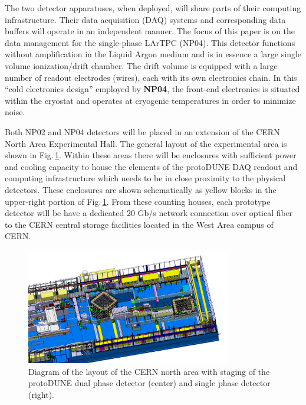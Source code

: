\documentclass[a4paper]{jpconf}
\newcommand{\pd}{protoDUNE\xspace}
\begin{document}
The two detector apparatuses, when deployed, will share parts of their
computing infrastructure.  Their data acquisition (DAQ) systems and
corresponding data buffers will operate in an independent manner. 
The focus of this paper is on the data management for the
single-phase LArTPC (NP04).
This detector  functions without amplification
in the Liquid Argon medium and is in essence a large single volume
ionization/drift chamber.  The drift volume is equipped with
a large number of readout electrodes (wires), each with its own electronics chain.
In this ``cold electronics design'' employed by \textbf{NP04},  the front-end electronics is situated within the cryostat and operates at cryogenic
temperatures in order to minimize noise.

Both NP02 and NP04 detectors will be placed in an extension of the CERN North Area Experimental Hall.
The general layout of the experimental area is shown in Fig.\,\ref{fig:np02np04}.
Within these areas there will be enclosures with sufficient power and cooling capacity to house
the elements of the \pd DAQ readout and computing infrastructure which
needs to be in close proximity to the physical detectors.
These enclosures are shown schematically as yellow blocks in the
upper-right portion of Fig.\,\ref{fig:np02np04}. From these counting
houses, each prototype detector will be have a dedicated 20 Gb/s
network connection over optical fiber to the CERN central storage
facilities located in the West Area campus of CERN.  

\begin{figure}[tb]
\centering\includegraphics[width=0.8\textwidth]{figures/np02np04.png}
\caption{\label{fig:np02np04}Diagram of the layout of the CERN north area with
  staging of the protoDUNE dual phase detector (center) and single
  phase detector (right).}
\end{figure}
\end{document}
